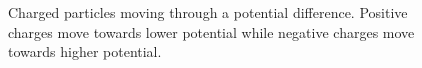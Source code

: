 \begin{figure}
    \centering

    

    \caption{Charged particles moving through a potential difference.
    Positive charges move towards lower potential while negative charges move towards higher potential.}
    \label{fig:potential_gradient}
\end{figure}